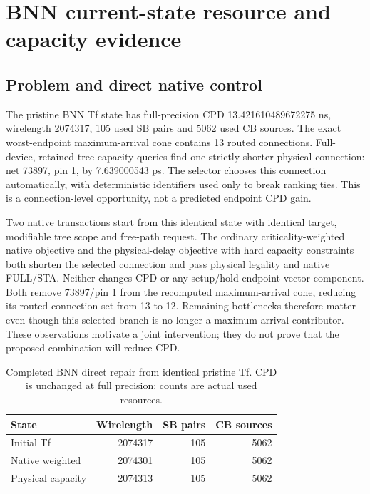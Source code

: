
\section{BNN current-state resource and capacity evidence}
\label{sec:bnn-current-resource}
\subsection{Problem and direct native control}
The pristine BNN Tf state has full-precision CPD 13.421610489672275 ns, wirelength 2074317, 105 used SB pairs and 5062 used CB sources. The exact worst-endpoint maximum-arrival cone contains 13 routed connections. Full-device, retained-tree capacity queries find one strictly shorter physical connection: net 73897, pin 1, by 7.639000543 ps. The selector chooses this connection automatically, with deterministic identifiers used only to break ranking ties. This is a connection-level opportunity, not a predicted endpoint CPD gain.

Two native transactions start from this identical state with identical target, modifiable tree scope and free-path request. The ordinary criticality-weighted native objective and the physical-delay objective with hard capacity constraints both shorten the selected connection and pass physical legality and native FULL/STA. Neither changes CPD or any setup/hold endpoint-vector component. Both remove 73897/pin 1 from the recomputed maximum-arrival cone, reducing its routed-connection set from 13 to 12. Remaining bottlenecks therefore matter even though this selected branch is no longer a maximum-arrival contributor. These observations motivate a joint intervention; they do not prove that the proposed combination will reduce CPD.

\begin{table}[t]
\centering\small
\caption{Completed BNN direct repair from identical pristine Tf. CPD is unchanged at full precision; counts are actual used resources.}
\label{tab:bnn-direct-resource}
\begin{tabular}{lrrr}
\hline
State & Wirelength & SB pairs & CB sources\\
\hline
Initial Tf & 2074317 & 105 & 5062\\
Native weighted & 2074301 & 105 & 5062\\
Physical capacity & 2074313 & 105 & 5062\\
\hline
\end{tabular}
\end{table}

